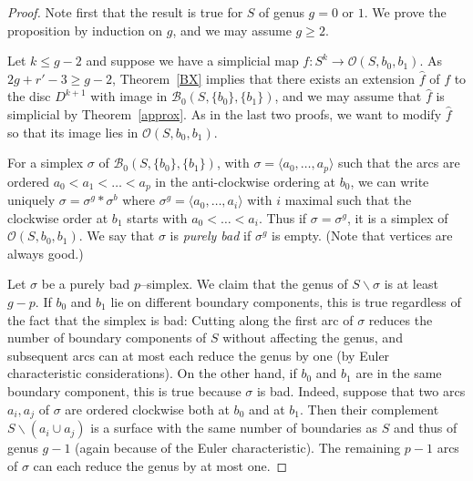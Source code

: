 \documentclass[10pt]{amsart}
\newcommand{\BB}{\mathcal{B}}
\newcommand{\OO}{\mathcal{O}}
\newcommand{\s}{\sigma}
\newcommand{\minus}{\backslash}
\newcommand{\lgl}{\langle}
\newcommand{\rgl}{\rangle}
\begin{document}
\begin{proof}
Note first that the result is true for $S$ of genus $g=0$ or $1$. We prove the proposition by induction on $g$, and 
we may assume $g\ge 2$. 

Let $k\le g-2$ and suppose we have a simplicial map $f\colon S^k\to \OO(S,b_0,b_1)$. 
As $2g+r'-3\ge g-2$, Theorem~\ref{BX} implies that there exists an extension $\hat f$ of $f$
to the disc $D^{k+1}$ with image in $\BB_0(S,\{b_0\},\{b_1\})$, 
and we may assume that $\hat f$ is simplicial by Theorem~\ref{approx}. 
As in the last two proofs, we want to modify $\hat f$ so that its image lies in $\OO(S,b_0,b_1)$. 

For a simplex $\s$ of $\BB_0(S,\{b_0\},\{b_1\})$, with $\s=\lgl a_0,\dots,a_p\rgl$ such that the arcs are ordered $a_0<a_1<\dots<a_p$ in the
anti-clockwise ordering at $b_0$, we can write uniquely
$\s=\s^g*\s^b$ where $\s^g=\lgl a_0,\dots,a_i\rgl$ with $i$ maximal such that the clockwise order at $b_1$ 
starts with $a_0<\dots<a_i$. Thus if $\s=\s^g$, it is a simplex of $\OO(S,b_0,b_1)$. We say that
$\s$ is {\em purely bad} if $\s^g$ is empty. (Note that vertices are always good.)

Let $\s$ be a purely bad $p$--simplex. We claim that the genus of $S\minus\s$ is at least $g-p$. 
If $b_0$ and $b_1$ lie on different boundary components,
this is true regardless of the fact that the simplex is bad:  Cutting along the first arc of $\s$ reduces the number
of boundary components of $S$ without affecting the genus, and subsequent arcs can at most each reduce the genus by one
(by Euler characteristic considerations). 
On the other hand, if $b_0$ and
$b_1$ are in the same boundary component, this is true because $\s$ is bad. 
Indeed, suppose that two arcs $a_i,a_j$ of $\s$ are ordered clockwise both at $b_0$
and at $b_1$. Then their complement $S\minus(a_i\cup a_j)$ is a surface with the same number of boundaries as $S$ and thus
of genus $g-1$ (again because of the Euler characteristic).
The remaining $p-1$ arcs of $\s$ can each reduce the genus by at most one. 


\end{proof}
\end{document}
